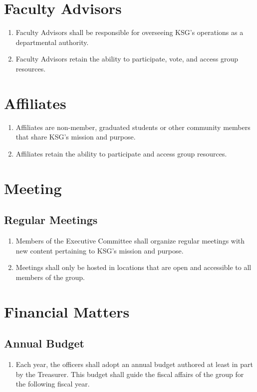 \documentclass[12pt,executivepaper]{article}
\begin{document}
\section{Faculty Advisors}
\begin{enumerate}
    \item Faculty Advisors shall be responsible for overseeing KSG's operations as
          a departmental authority.
    \item Faculty Advisors retain the ability to participate, vote, and access group
          resources.
\end{enumerate}

\section{Affiliates}
\begin{enumerate}
    \item Affiliates are non-member, graduated students or other community members
          that share KSG's mission and purpose.
    \item Affiliates retain the ability to participate and access group resources.
\end{enumerate}

\section{Meeting}

\subsection{Regular Meetings}
\begin{enumerate}
    \item Members of the Executive Committee shall organize regular meetings with
          new content pertaining to KSG's mission and purpose.
    \item Meetings shall only be hosted in locations that are open and accessible
          to all members of the group.
\end{enumerate}

\section{Financial Matters}

\subsection{Annual Budget}
\begin{enumerate}
    \item Each year, the officers shall adopt an annual budget authored at least in
          part by the Treasurer. This budget shall guide the fiscal affairs of the
          group for the following fiscal year.
\end{enumerate}
\end{document}
